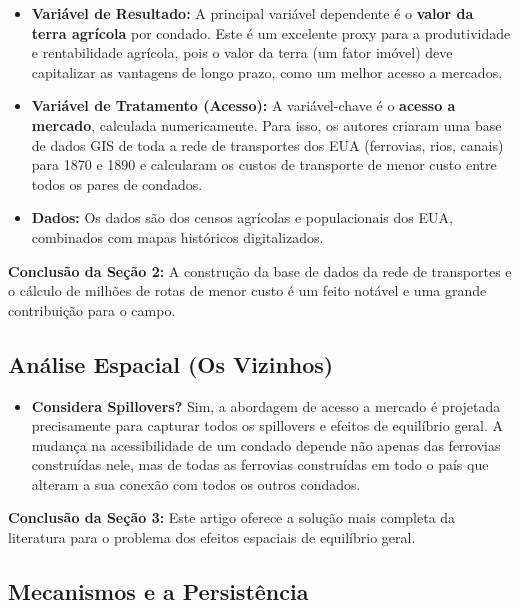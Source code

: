 \documentclass[12pt, a4paper]{article}
\begin{document}
\begin{itemize}
    \item \textbf{Variável de Resultado:} A principal variável dependente é o \textbf{valor da terra agrícola} por condado. Este é um excelente proxy para a produtividade e rentabilidade agrícola, pois o valor da terra (um fator imóvel) deve capitalizar as vantagens de longo prazo, como um melhor acesso a mercados.
    \item \textbf{Variável de Tratamento (Acesso):} A variável-chave é o \textbf{acesso a mercado}, calculada numericamente. Para isso, os autores criaram uma base de dados GIS de toda a rede de transportes dos EUA (ferrovias, rios, canais) para 1870 e 1890 e calcularam os custos de transporte de menor custo entre todos os pares de condados.
    \item \textbf{Dados:} Os dados são dos censos agrícolas e populacionais dos EUA, combinados com mapas históricos digitalizados.
\end{itemize}

\noindent\textbf{Conclusão da Seção 2:} A construção da base de dados da rede de transportes e o cálculo de milhões de rotas de menor custo é um feito notável e uma grande contribuição para o campo.

\subsection{Análise Espacial (Os Vizinhos)}

\begin{itemize}
    \item \textbf{Considera Spillovers?} Sim, a abordagem de acesso a mercado é projetada precisamente para capturar todos os spillovers e efeitos de equilíbrio geral. A mudança na acessibilidade de um condado depende não apenas das ferrovias construídas nele, mas de todas as ferrovias construídas em todo o país que alteram a sua conexão com todos os outros condados.
\end{itemize}

\noindent\textbf{Conclusão da Seção 3:} Este artigo oferece a solução mais completa da literatura para o problema dos efeitos espaciais de equilíbrio geral.

\subsection{Mecanismos e a Persistência}
\end{document}
